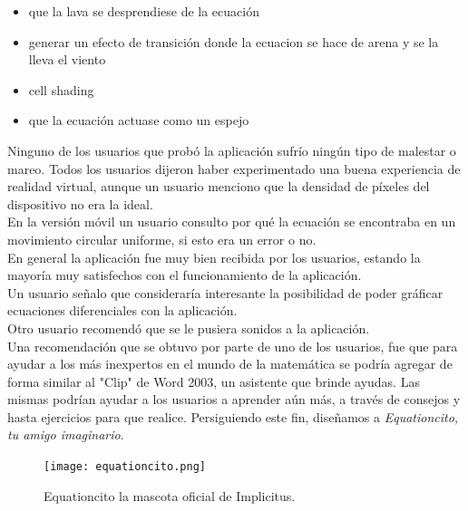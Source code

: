\documentclass[12pt]{article}
\begin{document}
\begin{itemize}
\item que la lava se desprendiese de la ecuación
\item generar un efecto de transición donde la ecuacion se hace de arena y se la lleva el viento
\item cell shading
\item que la ecuación actuase como un espejo
\end{itemize}
Ninguno de los usuarios que probó la aplicación sufrío ningún tipo de malestar o mareo. Todos los usuarios dijeron haber experimentado una buena experiencia de realidad virtual, aunque un usuario menciono que la densidad de píxeles del dispositivo no era la ideal.
\\En la versión móvil un usuario consulto por qué la ecuación se encontraba en un movimiento circular uniforme, si esto era un error o no.
\\En general la aplicación fue muy bien recibida por los usuarios, estando la mayoría muy satisfechos con el funcionamiento de la aplicación.
\\Un usuario señalo que consideraría interesante la posibilidad de poder gráficar ecuaciones diferenciales con la aplicación. 
\\Otro usuario recomendó que se le pusiera sonidos a la aplicación.
\\Una recomendación que se obtuvo por parte de uno de los usuarios, fue que para ayudar a los más inexpertos en el mundo de la matemática se podría agregar de forma similar al "Clip" de Word 2003, un asistente que brinde ayudas. Las mismas podrían ayudar a los usuarios a aprender aún más, a través de consejos y hasta ejercicios para que realice. Persiguiendo este fin, diseñamos a \textit{Equationcito, tu amigo imaginario}.
\begin{figure}[h]
\texttt{[image: equationcito.png]}
\caption{Equationcito la mascota oficial de Implicitus.}
\end{figure}
\clearpage
\end{document}
